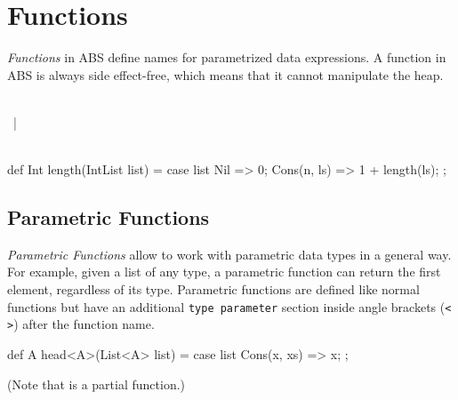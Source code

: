 \chapter{Functions}
\emph{Functions} in ABS define names for parametrized data expressions.
A function in ABS is always side effect-free, which means that it cannot
manipulate the heap.

\begin{abssyntax}
  {}\ \ \ \ \TRS{(}  \TRS{)}\ \TRS{=}\ 
                 \ \TRS{;}  \\
\NT{FunBody}       {} ~|~ \\
   \defn {}\ 
\end{abssyntax}

\begin{absexample}
def Int length(IntList list) =
  case list { 
    Nil => 0;
    Cons(n, ls) => 1 + length(ls);
  };
\end{absexample}

\section{Parametric Functions}
\label{sec:parametric-functions}

\emph{Parametric Functions} allow to work with parametric data types in a
general way.  For example, given a list of any type, a parametric
function \absinline{head} can return the first element, regardless of its
type.  Parametric functions are defined like normal functions but have
an additional \texttt{type parameter} section inside angle brackets
(\texttt{< >}) after the function name.

\begin{absexample}
def A head<A>(List<A> list) =
  case list {
    Cons(x, xs) => x;
  };
\end{absexample}

\noindent
(Note that  is a partial function.)